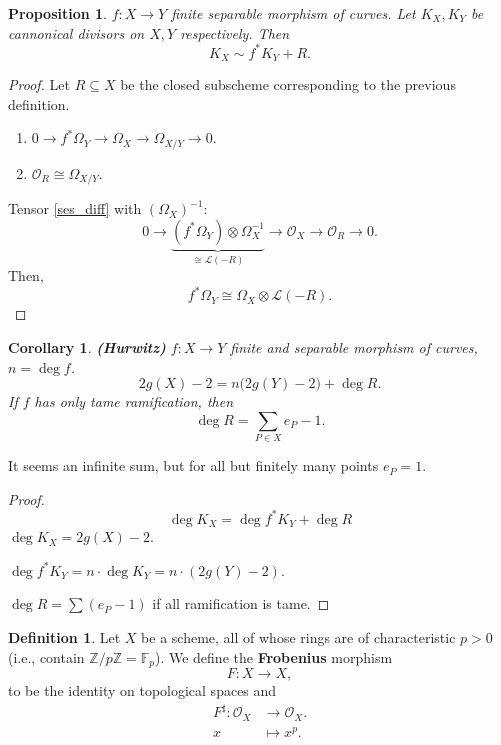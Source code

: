 \documentclass[12pt]{article}
\newtheorem*{proposition}{Proposition}
\newtheorem*{corollary}{Corollary}
\theoremstyle{definition}
\newtheorem*{definition}{Definition}
\begin{document}
\begin{proposition}
$f:X\rightarrow Y$ finite separable morphism of curves. Let $K_X,K_Y$ be cannonical divisors on $X,Y$ respectively. Then
\[K_X\sim f^*K_Y+R.\]
\end{proposition}

\begin{proof}
Let $R\subseteq X$ be the closed subscheme corresponding to the previous definition.
\begin{enumerate}[label=\arabic*)]
\item\label{ses_diff} $0\longrightarrow f^*\Omega_Y\longrightarrow\Omega_X\longrightarrow\Omega_{X/Y}\longrightarrow0$.
\item $\mathcal{O}_R\cong\Omega_{X/Y}$.
\end{enumerate}

Tensor \ref{ses_diff} with $(\Omega_X)^{-1}$:
\[0\longrightarrow\underbrace{(f^*\Omega_Y)\otimes\Omega_X^{-1}}_{\cong\mathcal{L}(-R)}\longrightarrow\mathcal{O}_X\longrightarrow\mathcal{O}_R\longrightarrow0.\]
Then,
\[f^*\Omega_Y\cong\Omega_X\otimes\mathcal{L}(-R).\]
\end{proof}

\begin{corollary}
\emph{\textbf{(Hurwitz)}} $f:X\rightarrow Y$ finite and separable morphism of curves, $n=\deg f$.
\[2g(X)-2=n\big(2g(Y)-2\big)+\deg R.\]
If $f$ has only tame ramification, then
\[\deg R=\sum_{P\in X}e_P-1.\]
\end{corollary}

It seems an infinite sum, but for all but finitely many points $e_P=1$.

\begin{proof}
\[\deg K_X=\deg f^*K_Y+\deg R\]
$\deg K_X=2g(X)-2$.

$\deg f^*K_Y=n\cdot\deg K_Y=n\cdot(2g(Y)-2)$.

$\deg R=\sum(e_P-1)$ if all ramification is tame.
\end{proof}

\begin{definition}
Let $X$ be a scheme, all of whose rings are of characteristic $p>0$ (i.e., contain $\mathbb{Z}/p\mathbb{Z}=\mathbb{F}_p$). We define the \textbf{Frobenius} morphism
\[F:X\longrightarrow X,\]
to be the identity on topological spaces and
\begin{align*}\tag{$p$-th power map}
F^{\sharp}:\mathcal{O}_X&\longrightarrow\mathcal{O}_X.\\
x&\longmapsto x^p.
\end{align*}
\end{definition}
\end{document}
